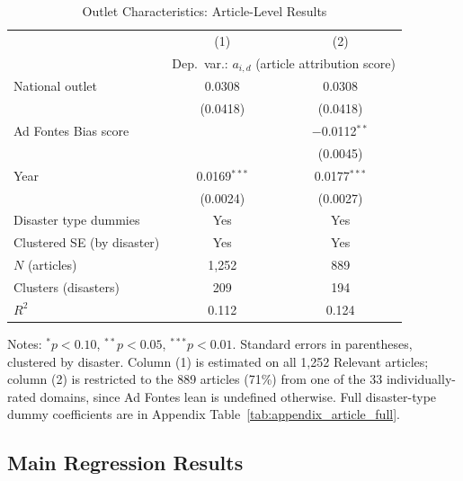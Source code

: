\documentclass[12pt]{article}
\begin{document}
\begin{table}[ht]
\centering
\caption{Outlet Characteristics: Article-Level Results}
\label{tab:outlet_results}
\begin{threeparttable}
\begin{tabular}{lcc}
\toprule
 & (1) & (2) \\
 & \multicolumn{2}{c}{Dep.\ var.: $a_{i,d}$ (article attribution score)} \\
\midrule
National outlet      & 0.0308   & 0.0308   \\
                      & (0.0418) & (0.0418) \\
Ad Fontes Bias score  &          & $-$0.0112$^{**}$ \\
                      &          & (0.0045) \\
Year                  & 0.0169$^{***}$ & 0.0177$^{***}$ \\
                      & (0.0024) & (0.0027) \\
\midrule
Disaster type dummies & Yes & Yes \\
Clustered SE (by disaster) & Yes & Yes \\
$N$ (articles)        & 1{,}252 & 889 \\
Clusters (disasters)  & 209 & 194 \\
$R^2$                 & 0.112 & 0.124 \\
\bottomrule
\end{tabular}
\begin{tablenotes}
\small
\item Notes: $^{*}p<0.10$, $^{**}p<0.05$, $^{***}p<0.01$. Standard errors
in parentheses, clustered by disaster. Column (1) is estimated on all
1,252 Relevant articles; column (2) is restricted to the 889 articles
(71\%) from one of the 33 individually-rated domains, since Ad Fontes
lean is undefined otherwise. Full disaster-type dummy coefficients are in
Appendix Table~\ref{tab:appendix_article_full}.
\end{tablenotes}
\end{threeparttable}
\end{table}

\clearpage
\subsection{Main Regression Results}
\end{document}
